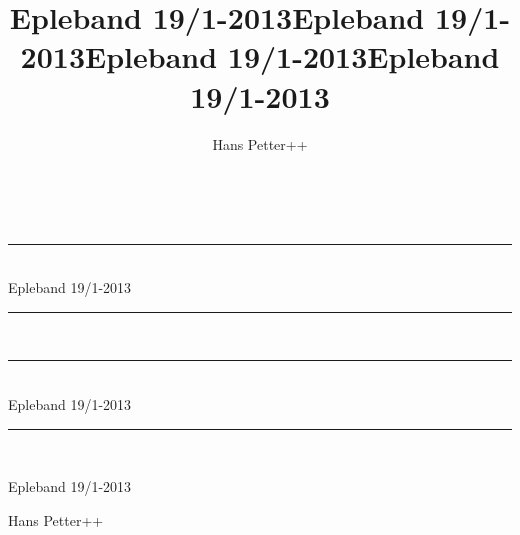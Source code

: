 \documentclass[%
twoside,                 %
final,                   %
10pt]{article}
\begin{document}







\title{{\color{seccolor} Epleband 19/1-2013}}
\title{Epleband 19/1-2013}


\thispagestyle{empty}
\hbox{\ \ }
\vfill
\begin{center}
{\huge{\bfseries{
\begin{spacing}{1.25}
{\color{seccolor}\rule{\linewidth}{0.5mm}} \\[0.4cm]
{\color{seccolor}Epleband 19/1-2013}
\\[0.4cm] {\color{seccolor}\rule{\linewidth}{0.5mm}} \\[1.5cm]
{\rule{\linewidth}{0.5mm}} \\[0.4cm]
{Epleband 19/1-2013}
\\[0.4cm] {\rule{\linewidth}{0.5mm}} \\[1.5cm]
\end{spacing}
}}}

\title*{Epleband 19/1-2013}

\title{Epleband 19/1-2013}
\thispagestyle{empty}

\begin{center}
{\LARGE\bf
\begin{spacing}{1.25}
Epleband 19/1-2013
\end{spacing}
}
\end{center}



\author{Hans Petter++}

\vspace{1.3cm}

    {\Large\textsf{Hans Petter++${}^{}$}}\\ [3mm]
    

\end{center}
\end{document}
